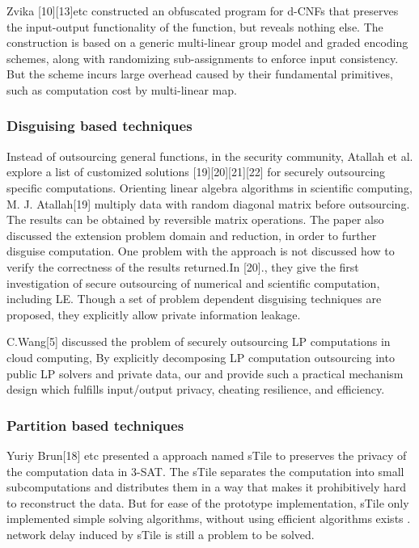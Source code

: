 \documentclass[runningheads,a4paper]{llncs}
\begin{document}
Zvika [10][13]etc constructed an obfuscated program for d-CNFs that preserves the input-output functionality of the function, but reveals nothing else. The construction is based on a generic multi-linear group model and graded encoding schemes, along with randomizing sub-assignments to enforce input consistency. But the scheme incurs large overhead caused by their fundamental primitives, such as computation cost by multi-linear map.
\subsubsection{Disguising based techniques}

Instead of outsourcing general functions, in the security community, Atallah et al. explore a list of customized solutions [19][20][21][22] for securely outsourcing specific computations. Orienting linear algebra algorithms in scientific computing, M. J. Atallah[19] multiply data with random diagonal matrix before outsourcing. The results can be obtained by reversible matrix operations. The paper also discussed the extension problem domain and reduction, in order to further disguise computation. One problem with the approach is not discussed how to verify the correctness of the results returned.In [20]., they give the first investigation of secure outsourcing of numerical and scientific computation, including LE. Though a set of problem dependent disguising techniques are proposed, they explicitly allow private information leakage.

C.Wang[5] discussed the problem of securely outsourcing LP computations in cloud computing, By explicitly decomposing LP computation outsourcing into public LP solvers and private data, our 
and provide such a practical mechanism design which fulfills input/output privacy, cheating resilience, and efficiency.

\subsubsection{Partition based techniques}

Yuriy Brun[18] etc presented a approach named sTile to preserves the privacy of the computation data in 3-SAT. The sTile separates the computation into small subcomputations and distributes them in a way that makes it prohibitively hard to reconstruct the data. But for ease of the prototype implementation, sTile only implemented simple solving algorithms, without using efficient algorithms exists . network delay induced by sTile is still a problem to be solved.
\end{document}
